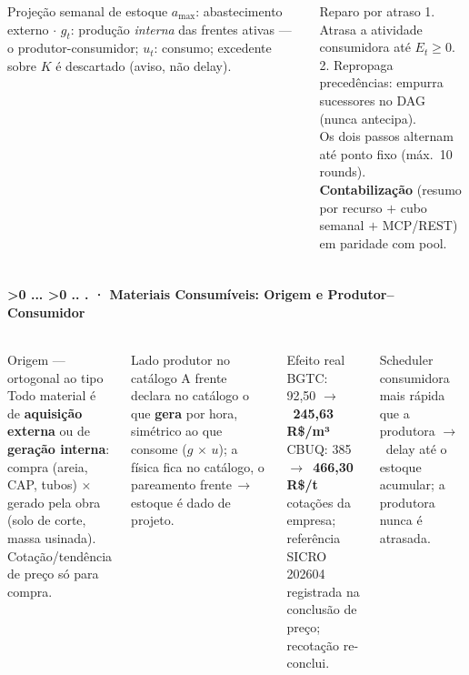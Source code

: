 \documentclass[aspectratio=169,10pt]{beamer}
\newcommand{\arr}{$\rightarrow$}
\newcounter{mlc3}[subsection]
\newcounter{mlc4}[mlc3]
\newcommand{\pathnum}{%
  \ifnum\value{mlc4}>0
    \thesection.\thesubsection.\arabic{mlc3}.\arabic{mlc4}%
  \else\ifnum\value{mlc3}>0
    \thesection.\thesubsection.\arabic{mlc3}%
  \else
    \thesection.\thesubsection%
  \fi\fi
}
\newcommand{\lvlA}{\stepcounter{mlc3}}   %
\newcommand{\mtitle}[1]{%
  \frametitle{\insertsection}%
  \framesubtitle{\pathnum\;·\; #1}}
\begin{document}
\begin{frame}
\begin{columns}[T]
\begin{block}{Projeção semanal de estoque}
      \scriptsize $a_{\max}$: abastecimento externo $\cdot$ $g_t$: produção
      \emph{interna} das frentes ativas --- o produtor-consumidor;
      $u_t$: consumo; excedente sobre $K$ é descartado (aviso, não delay).
    \end{block}
    \vspace{4pt}
    \begin{exampleblock}{\small Reparo por atraso}
      \scriptsize
      1. Atrasa a atividade consumidora até $E_t \geq 0$.\\
      2. Repropaga precedências: empurra sucessores no DAG
      (nunca antecipa).\\
      Os dois passos alternam até ponto fixo (máx.\ 10 rounds).\\
      \textbf{Contabilização} (resumo por recurso $+$ cubo semanal $+$
      MCP/REST) em paridade com pool.
    \end{exampleblock}
  \end{columns}
\end{frame}

\lvlA
\begin{frame}
  \mtitle{Materiais Consumíveis: Origem e Produtor--Consumidor}
  \begin{columns}[T]
    \begin{block}{Origem — ortogonal ao tipo}
      \scriptsize
      Todo material é de \textbf{aquisição externa} ou de
      \textbf{geração interna}:\\[2pt]
      compra (areia, CAP, tubos) $\times$ gerado pela obra (solo de
      corte, massa usinada). Cotação/tendência de preço só para compra.
    \end{block}
    \vspace{4pt}
    \begin{block}{Lado produtor no catálogo}
      \scriptsize A frente declara no catálogo o que \textbf{gera} por
      hora, simétrico ao que consome ($g$ $\times$ $u$); a física fica
      no catálogo, o pareamento frente\,\arr\,estoque é dado de projeto.
    \end{block}
    \begin{block}{Efeito real}
      \scriptsize BGTC: 92{,}50 \arr\ \textbf{245{,}63 R\$/m³}\\
      CBUQ: 385 \arr\ \textbf{466{,}30 R\$/t}\\
      \tiny cotações da empresa; referência SICRO 202604 registrada na
      conclusão de preço; recotação re-conclui.
    \end{block}
    \vspace{4pt}
    \begin{block}{Scheduler}
      \scriptsize consumidora mais rápida que a produtora \arr\ delay
      até o estoque acumular; a produtora nunca é atrasada.
    \end{block}
  \end{columns}
\end{frame}
\end{document}

